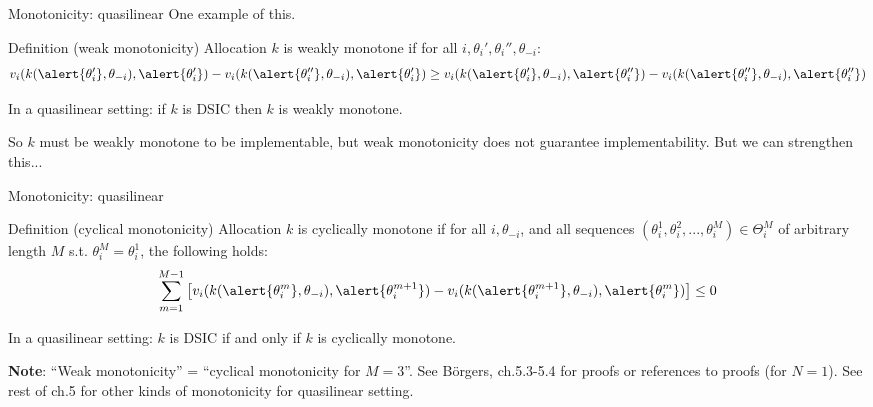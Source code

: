 \documentclass[english,10pt
,aspectratio=169
]{beamer}
\begin{document}
\begin{frame}{Monotonicity: quasilinear}
	One example of this.
	\begin{exampleblock}{Definition (weak monotonicity)}
		Allocation $k$ is \alert{weakly monotone} if for all $i,\theta_i',\theta_i'',\theta_{-i}$:
		\begin{equation*}
			v_{i}(k(\alert{\theta_{i}'}, \theta_{-i}), \alert{\theta_{i}'}) - 
			v_{i}(k(\alert{\theta_{i}''}, \theta_{-i}), \alert{\theta_{i}'}) 
			\geq 
			v_{i}(k(\alert{\theta_{i}'}, \theta_{-i}), \alert{\theta_{i}''}) - 
			v_{i}(k(\alert{\theta_{i}''}, \theta_{-i}), \alert{\theta_{i}''}) 
		\end{equation*}
	\end{exampleblock}
	\begin{theorem}
		In a quasilinear setting: if $k$ is DSIC then $k$ is weakly monotone.
	\end{theorem}
	So $k$ must be weakly monotone to be implementable, but weak monotonicity does not guarantee implementability. But we can strengthen this...
\end{frame}


\begin{frame}{Monotonicity: quasilinear}
	\begin{exampleblock}{Definition (cyclical monotonicity)}
		Allocation $k$ is \alert{cyclically monotone} if for all $i,\theta_{-i}$, and all sequences $(\theta_i^1,\theta_i^2,...,\theta_i^M)\in \Theta_i^M$ of arbitrary length $M$ s.t. $\theta_i^M=\theta_i^1$, the following holds:
		\begin{equation*}
			\sum_{m=1}^{M-1}
			\left[
			v_{i}(k(\alert{\theta_{i}^m}, \theta_{-i}), \alert{\theta_{i}^{m+1}}) - 
			v_{i}(k(\alert{\theta_{i}^{m+1}}, \theta_{-i}), \alert{\theta_{i}^m}) 
			\right] 
			\leq 0
		\end{equation*}
	\end{exampleblock}
	\begin{theorem}[Rochet, 1987]
		In a quasilinear setting: $k$ is DSIC if and only if $k$ is cyclically monotone.
	\end{theorem}
	\textbf{Note}: ``Weak monotonicity'' = ``cyclical monotonicity for $M=3$''.
	See B{\"o}rgers, ch.5.3-5.4 for proofs or references to proofs (for $N=1$). See rest of ch.5 for other kinds of monotonicity for quasilinear setting.
\end{frame}
\end{document}
